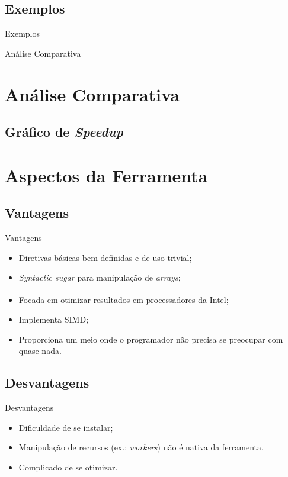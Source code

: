 \documentclass{beamer}
\begin{document}
\subsection{Exemplos}
\begin{frame}{Exemplos}
\end{frame}

\begin{frame}{Análise Comparativa}
\section{Análise Comparativa}
\subsection{Gráfico de \protect\textit{Speedup}}
\end{frame}

\section{Aspectos da Ferramenta}
\subsection{Vantagens}
\begin{frame}{Vantagens}
\begin{itemize}
    \item Diretivas básicas bem definidas e de uso trivial;
    \item \textit{Syntactic sugar} para manipulação de \textit{arrays};
    \item Focada em otimizar resultados em processadores da
    Intel\textsuperscript{\textregistered};
    \item Implementa SIMD;
    \item Proporciona um meio onde o programador não precisa se preocupar com
    quase nada.
\end{itemize}
\end{frame}



\subsection{Desvantagens}
\begin{frame}{Desvantagens}
\begin{itemize}
    \item Dificuldade de se instalar;
    \item Manipulação de recursos (ex.: \textit{workers}) não é nativa da
    ferramenta.
    \item Complicado de se otimizar.
\end{itemize}

\end{frame}
\end{document}
